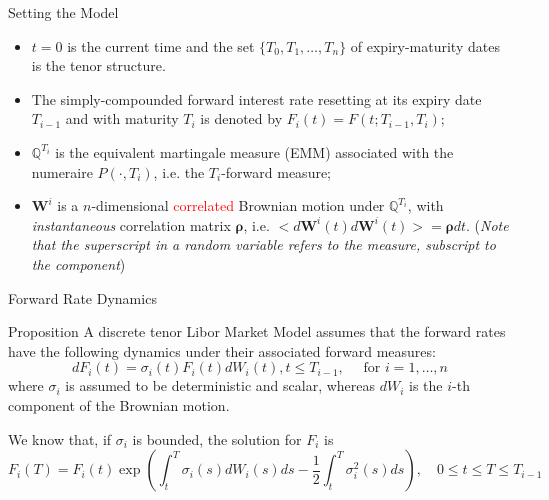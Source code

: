 \documentclass{beamer}
\begin{document}
\begin{frame}{Setting the Model}
  \begin{itemize}
  \item<1-> $t = 0$ is the current time and the set $\{T_0, T_1, \dots, T_n\}$ of expiry-maturity dates is the tenor structure. %
  \item<2-> The simply-compounded forward interest rate resetting at its expiry date $T_{i-1}$ and with maturity $T_i$ is denoted by $F_i(t) = F(t; T_{i-1}, T_i)$;
  \item<3-> $\mathbb{Q}^{T_i}$ is the equivalent martingale measure (EMM) associated with the numeraire $P(\cdot, T_i)$, i.e. the $T_i$-forward measure;
  \item<4-> $\bm{W}^i$ is a $n$-dimensional \textcolor{red}{correlated} Brownian motion under $\mathbb{Q}^{T_i}$, with \emph{instantaneous} correlation matrix $\bm{\rho}$, i.e. $< d\bm{W}^i(t) d\bm{W}^i(t)> = \bm{\rho} dt$. 
  (\emph{Note that the superscript in a random variable refers to the measure, subscript to the component})
  \end{itemize}
\end{frame}

\begin{frame}{Forward Rate Dynamics}
  \begin{block}{Proposition}
    A discrete tenor Libor Market Model assumes that the forward rates have the following dynamics under their associated forward measures:
    \begin{equation}
      dF_i(t) = \sigma_i(t)F_i(t)dW_i(t), t \le T_{i-1},\quad\text{ for } i = 1,\ldots, n
      \label{eq:forward_process_lmm}
    \end{equation}
    where $\sigma_i$ is assumed to be deterministic and scalar, whereas $dW_i$ is the $i$-th component of the Brownian motion.
  \end{block}
\pause
  We know that, if $\sigma_i$ is bounded, the solution for $F_i$ is 
  \begin{equation*}
    F_i(T) = F_i(t) \exp\left(\int_t^T\sigma_i(s)dW_i(s)ds - \frac{1}{2}\int_t^T 
    \sigma_i^2(s)ds\right),\quad 0\le t \le T \le T_{i-1} 
  \end{equation*}
\end{frame}
\end{document}
